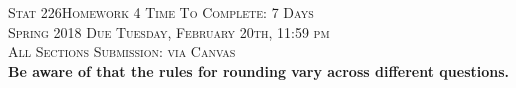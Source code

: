 \documentclass[11pt]{article}
\newcommand{\red}[1]{{\color{red} #1}}
\begin{document}
\large \noindent \textsc{Stat 226}\hfill \Large{\textsc{Homework 4}} \hfill \textsc{Time To Complete: 7 Days }\\
\large \textsc{Spring 2018}  \hfill \textsc{Due Tuesday, February 20th, \red{11:59 pm}}\\
\large \textsc{All Sections}  \hfill \textsc{Submission: via Canvas}\\


\textbf{\red{Be aware of that the rules for rounding vary across different questions. }}


\begin{enumerate}


\vspace{.25cm}
\newpage

\vspace{.25cm}
\newpage

\vspace{.25cm}
\end{enumerate}
\end{document}
